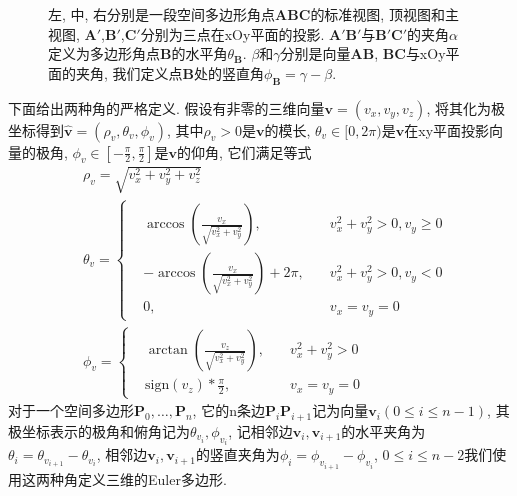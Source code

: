 \documentclass[utf8]{ctexart} %
\begin{document}
\begin{figure}[ht]
\begin{minipage}[b]{0.33\textwidth}
 	\end{minipage}
	 	\caption{\small{左, 中, 右分别是一段空间多边形角点$\boldsymbol{ABC}$的标准视图, 顶视图和主视图,  $\boldsymbol{A}'$,$\boldsymbol{B}'$,$\boldsymbol{C}'$分别为三点在xOy平面的投影. $\boldsymbol{A}'\boldsymbol{B}'$与$\boldsymbol{B}'\boldsymbol{C}'$的夹角$\alpha$定义为多边形角点$\boldsymbol{B}$的水平角$\theta_{\boldsymbol{B}}$. $\beta$和$\gamma$分别是向量$\boldsymbol{AB}$, $\boldsymbol{BC}$与xOy平面的夹角, 我们定义点$\boldsymbol{B}$处的竖直角$\phi_{\boldsymbol{B}}=\gamma-\beta$. }}
	 \end{figure}
	  下面给出两种角的严格定义. 假设有非零的三维向量$\boldsymbol{v}=(v_x,v_y,v_z)$, 将其化为极坐标得到$\hat{\boldsymbol{v}}=(\rho_v,\theta_v,\phi_v)$, 其中$\rho_v>0$是$\boldsymbol{v}$的模长, $\theta_v\in[0,2\pi)$是$\boldsymbol{v}$在xy平面投影向量的极角, $\phi_v\in[-\frac{\pi}2,\frac{\pi}2]$是$\boldsymbol{v}$的仰角, 它们满足等式
	 \begin{equation}\label{angle_compute}
	 \begin{aligned}
	 &\rho_v = \sqrt{v_x^2+v_y^2+v_z^2}\\
	 &\theta_v =
	 \left\{
	 \begin{aligned}
	 &\arccos(\frac{v_x}{\sqrt{v_x^2+v_y^2}}),\quad &v_x^2+v_y^2>0, v_y\geq0\\
	 &-\arccos(\frac{v_x}{\sqrt{v_x^2+v_y^2}})+2\pi, \quad &v_x^2+v_y^2>0, v_y<0\\
	 &0, \quad &v_x=v_y=0
	 \end{aligned}
	 \right.\\
	 &\phi_v = \left\{
	 \begin{aligned}
	 &\arctan(\frac{v_z}{\sqrt{v_x^2+v_y^2}}),\quad &v_x^2+v_y^2>0\\
	 &\mathrm{sign}(v_z)*\frac{\pi}2,\quad &v_x=v_y=0
	 \end{aligned}
	 \right.
	 \end{aligned}
	 \end{equation} 对于一个空间多边形$\boldsymbol{P}_0,\dots,\boldsymbol{P}_n$, 它的n条边$\boldsymbol{P}_i\boldsymbol{P}_{i+1}$记为向量$\boldsymbol{v}_i(0\leq i\leq n-1)$, 其极坐标表示的极角和俯角记为$\theta_{v_i}, \phi_{v_i}$, 记相邻边$\boldsymbol{v}_i, \boldsymbol{v}_{i+1}$的水平夹角为$\theta_i = \theta_{v_{i+1}}-\theta_{v_i}$, 相邻边$\boldsymbol{v}_i, \boldsymbol{v}_{i+1}$的竖直夹角为$\phi_i = \phi_{v_{i+1}}-\phi_{v_i}$, $0\leq i\leq n-2$我们使用这两种角定义三维的Euler多边形.
\end{document}
